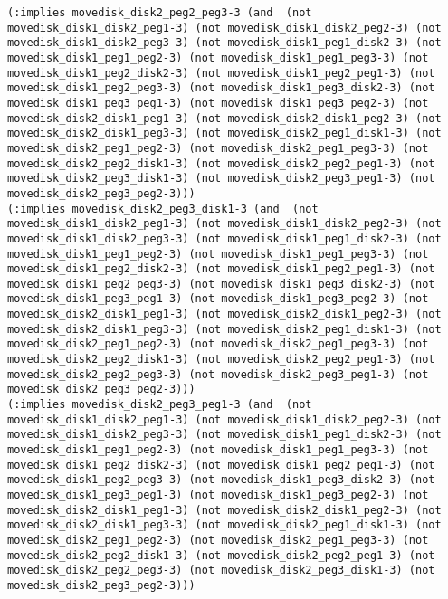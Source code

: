 \documentclass[12pt,letterpaper]{ntdhw}
\begin{document}
\begin{enumerate}
\begin{enumerate}
\begin{lstlisting}[language=pddl, style=pddlstyle,
  basicstyle=\scriptsize]
(:implies movedisk_disk2_peg2_peg3-3 (and  (not movedisk_disk1_disk2_peg1-3) (not movedisk_disk1_disk2_peg2-3) (not movedisk_disk1_disk2_peg3-3) (not movedisk_disk1_peg1_disk2-3) (not movedisk_disk1_peg1_peg2-3) (not movedisk_disk1_peg1_peg3-3) (not movedisk_disk1_peg2_disk2-3) (not movedisk_disk1_peg2_peg1-3) (not movedisk_disk1_peg2_peg3-3) (not movedisk_disk1_peg3_disk2-3) (not movedisk_disk1_peg3_peg1-3) (not movedisk_disk1_peg3_peg2-3) (not movedisk_disk2_disk1_peg1-3) (not movedisk_disk2_disk1_peg2-3) (not movedisk_disk2_disk1_peg3-3) (not movedisk_disk2_peg1_disk1-3) (not movedisk_disk2_peg1_peg2-3) (not movedisk_disk2_peg1_peg3-3) (not movedisk_disk2_peg2_disk1-3) (not movedisk_disk2_peg2_peg1-3) (not movedisk_disk2_peg3_disk1-3) (not movedisk_disk2_peg3_peg1-3) (not movedisk_disk2_peg3_peg2-3)))
(:implies movedisk_disk2_peg3_disk1-3 (and  (not movedisk_disk1_disk2_peg1-3) (not movedisk_disk1_disk2_peg2-3) (not movedisk_disk1_disk2_peg3-3) (not movedisk_disk1_peg1_disk2-3) (not movedisk_disk1_peg1_peg2-3) (not movedisk_disk1_peg1_peg3-3) (not movedisk_disk1_peg2_disk2-3) (not movedisk_disk1_peg2_peg1-3) (not movedisk_disk1_peg2_peg3-3) (not movedisk_disk1_peg3_disk2-3) (not movedisk_disk1_peg3_peg1-3) (not movedisk_disk1_peg3_peg2-3) (not movedisk_disk2_disk1_peg1-3) (not movedisk_disk2_disk1_peg2-3) (not movedisk_disk2_disk1_peg3-3) (not movedisk_disk2_peg1_disk1-3) (not movedisk_disk2_peg1_peg2-3) (not movedisk_disk2_peg1_peg3-3) (not movedisk_disk2_peg2_disk1-3) (not movedisk_disk2_peg2_peg1-3) (not movedisk_disk2_peg2_peg3-3) (not movedisk_disk2_peg3_peg1-3) (not movedisk_disk2_peg3_peg2-3)))
(:implies movedisk_disk2_peg3_peg1-3 (and  (not movedisk_disk1_disk2_peg1-3) (not movedisk_disk1_disk2_peg2-3) (not movedisk_disk1_disk2_peg3-3) (not movedisk_disk1_peg1_disk2-3) (not movedisk_disk1_peg1_peg2-3) (not movedisk_disk1_peg1_peg3-3) (not movedisk_disk1_peg2_disk2-3) (not movedisk_disk1_peg2_peg1-3) (not movedisk_disk1_peg2_peg3-3) (not movedisk_disk1_peg3_disk2-3) (not movedisk_disk1_peg3_peg1-3) (not movedisk_disk1_peg3_peg2-3) (not movedisk_disk2_disk1_peg1-3) (not movedisk_disk2_disk1_peg2-3) (not movedisk_disk2_disk1_peg3-3) (not movedisk_disk2_peg1_disk1-3) (not movedisk_disk2_peg1_peg2-3) (not movedisk_disk2_peg1_peg3-3) (not movedisk_disk2_peg2_disk1-3) (not movedisk_disk2_peg2_peg1-3) (not movedisk_disk2_peg2_peg3-3) (not movedisk_disk2_peg3_disk1-3) (not movedisk_disk2_peg3_peg2-3)))

\end{lstlisting}
\end{enumerate}
\end{enumerate}
\end{document}
